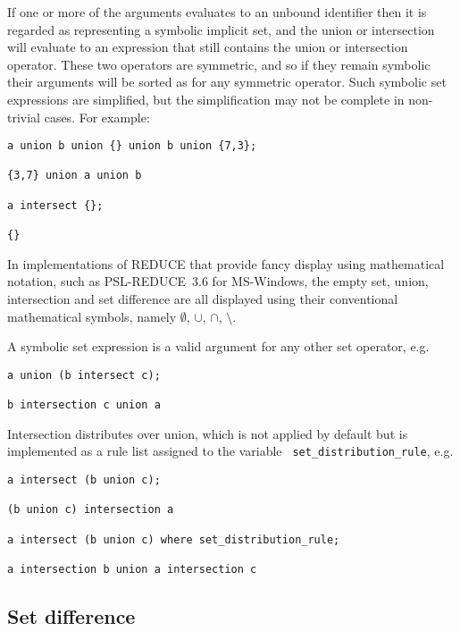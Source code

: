 If one or more of the arguments evaluates to an unbound identifier
then it is regarded as representing a symbolic implicit set, and the
union or intersection will evaluate to an expression that still
contains the union or intersection operator.  These two operators are
symmetric, and so if they remain symbolic their arguments will be
sorted as for any symmetric operator.  Such symbolic set expressions
are simplified, but the simplification may not be complete in
non-trivial cases.  For example:
\begin{verbatim}
a union b union {} union b union {7,3};

{3,7} union a union b

a intersect {};

{}
\end{verbatim}

In implementations of REDUCE that provide fancy display using
mathematical notation, such as PSL-REDUCE~3.6 for MS-Windows, the
empty set, union, intersection and set difference are all displayed
using their conventional mathematical symbols, namely $\emptyset$,
$\cup$, $\cap$, $\setminus$.

A symbolic set expression is a valid argument for any other set
operator, e.g.
\begin{verbatim}
a union (b intersect c);

b intersection c union a
\end{verbatim}

Intersection distributes over union, which is not applied by default
but is implemented as a rule list assigned to the variable {\tt
set\_distribution\_rule}, e.g.
\begin{verbatim}
a intersect (b union c);

(b union c) intersection a

a intersect (b union c) where set_distribution_rule;

a intersection b union a intersection c
\end{verbatim}


\subsection{Set difference}

